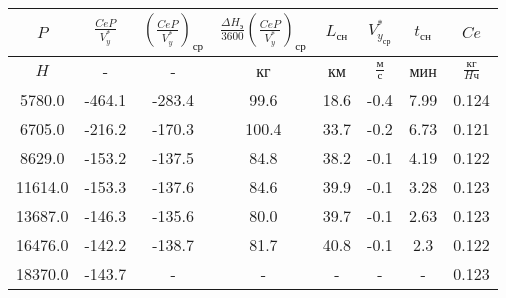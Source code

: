 \begin{tabular}{|c|c|c|c|c|c|c|c|}
\hline
$P$ & $\frac{CeP}{V_y^*}$ & $(\frac{CeP}{V_y^*})_{ср}$ & $\frac{\Delta H_э}{3600}(\frac{CeP}{V_y^*})_{ср}$ & $L_{сн}$ & $V_{y_{ср}}^*$ & $t_{сн}$ & $Ce$ \\ 
\hline
$H$ & - & - & кг & км & $\frac{м}{с}$ & мин & $\frac{кг}{H ч}$ \\ 
\hline
5780.0 & -464.1 & -283.4 & 99.6 & 18.6 & -0.4 & 7.99 & 0.124 \\ 
\hline
6705.0 & -216.2 & -170.3 & 100.4 & 33.7 & -0.2 & 6.73 & 0.121 \\ 
\hline
8629.0 & -153.2 & -137.5 & 84.8 & 38.2 & -0.1 & 4.19 & 0.122 \\ 
\hline
11614.0 & -153.3 & -137.6 & 84.6 & 39.9 & -0.1 & 3.28 & 0.123 \\ 
\hline
13687.0 & -146.3 & -135.6 & 80.0 & 39.7 & -0.1 & 2.63 & 0.123 \\ 
\hline
16476.0 & -142.2 & -138.7 & 81.7 & 40.8 & -0.1 & 2.3 & 0.122 \\ 
\hline
18370.0 & -143.7 & - & - & - & - & - & 0.123 \\ 
\hline
\end{tabular}